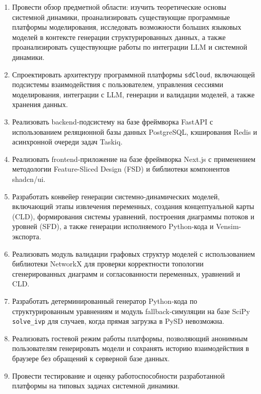\begin{enumerate}
    \item Провести обзор предметной области: изучить теоретические основы системной динамики, проанализировать существующие программные платформы моделирования, исследовать возможности больших языковых моделей в контексте генерации структурированных данных, а также проанализировать существующие работы по интеграции LLM и системной динамики.

    \item Спроектировать архитектуру программной платформы \texttt{sdCloud}, включающей подсистемы взаимодействия с пользователем, управления сессиями моделирования, интеграции с LLM, генерации и валидации моделей, а также хранения данных.

    \item Реализовать backend-подсистему на базе фреймворка FastAPI с использованием реляционной базы данных PostgreSQL, кэширования Redis и асинхронной очереди задач Taskiq.

    \item Реализовать frontend-приложение на базе фреймворка Next.js с применением методологии Feature-Sliced Design (FSD) и библиотеки компонентов shadcn/ui.

    \item Разработать конвейер генерации системно-динамических моделей, включающий этапы извлечения переменных, создания концептуальной карты (CLD), формирования системы уравнений, построения диаграммы потоков и уровней (SFD), а также генерации исполняемого Python-кода и Vensim-экспорта.

    \item Реализовать модуль валидации графовых структур моделей с использованием библиотеки NetworkX для проверки корректности топологии сгенерированных диаграмм и согласованности переменных, уравнений и CLD.

    \item Разработать детерминированный генератор Python-кода по структурированным уравнениям и модуль fallback-симуляции на базе SciPy \texttt{solve\_ivp} для случаев, когда прямая загрузка в PySD невозможна.

    \item Реализовать гостевой режим работы платформы, позволяющий анонимным пользователям генерировать модели и сохранять историю взаимодействия в браузере без обращений к серверной базе данных.

    \item Провести тестирование и оценку работоспособности разработанной платформы на типовых задачах системной динамики.
\end{enumerate}


